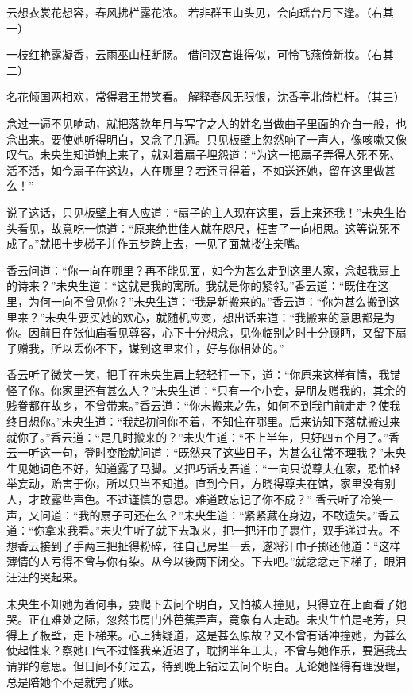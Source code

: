 \documentclass[a4paper,12pt,UTF8,twoside]{ctexbook}
\begin{document}
云想衣裳花想容，春风拂栏露花浓。
若非群玉山头见，会向瑶台月下逢。（右其一）

一枝红艳露凝香，云雨巫山枉断肠。
借问汉宫谁得似，可怜飞燕倚新妆。（右其二）

名花倾国两相欢，常得君王带笑看。
解释春风无限恨，沈香亭北倚栏杆。（其三）

念过一遍不见响动，就把落款年月与写字之人的姓名当做曲子里面的介白一般，也念出来。要使她听得明白，又念了几遍。只见板壁上忽然响了一声人，像咳嗽又像叹气。未央生知道她上来了，就对着扇子埋怨道：“为这一把扇子弄得人死不死、活不活，如今扇子在这边，人在哪里？若还寻得着，不如送还她，留在这里做甚么！”

说了这话，只见板壁上有人应道：“扇子的主人现在这里，丢上来还我！”未央生抬头看见，故意吃一惊道：“原来绝世佳人就在咫尺，枉害了一向相思。这等说死不成了。”就把十步梯子并作五步跨上去，一见了面就搂住亲嘴。

香云问道：“你一向在哪里？再不能见面，如今为甚么走到这里人家，念起我扇上的诗来？”未央生道：“这就是我的寓所。我就是你的紧邻。”香云道：“既住在这里，为何一向不曾见你？”未央生道：“我是新搬来的。”香云道：“你为甚么搬到这里来？”未央生要买她的欢心，就随机应变，想出话来道：“我搬来的意思都是为你。因前日在张仙庙看见尊容，心下十分想念，见你临别之时十分顾眄，又留下扇子赠我，所以丢你不下，谋到这里来住，好与你相处的。”

香云听了微笑一笑，把手在未央生肩上轻轻打一下，道：“你原来这样有情，我错怪了你。你家里还有甚么人？”未央生道：“只有一个小妾，是朋友赠我的，其余的贱眷都在故乡，不曾带来。”香云道：“你未搬来之先，如何不到我门前走走？使我终日想你。”未央生道：“我起初问你不着，不知住在哪里。后来访知下落就搬过来就你了。”香云道：“是几时搬来的？”未央生道：“不上半年，只好四五个月了。”香云一听这一句，登时变脸就问道：“既然来了这些日子，为甚么往常不理我？”未央生见她词色不好，知道露了马脚。又把巧话支吾道：“一向只说尊夫在家，恐怕轻举妄动，贻害于你，所以只当不知道。直到今日，方晓得尊夫在馆，家里没有别人，才敢露些声色。不过谨慎的意思。难道敢忘记了你不成？” 香云听了冷笑一声，又问道：“我的扇子可还在么？”未央生道：“紧紧藏在身边，不敢遗失。”香云道：“你拿来我看。”未央生听了就下去取来，把一把汗巾子裹住，双手递过去。不想香云接到了手两三把扯得粉碎，往自己房里一丢，遂将汗巾子掷还他道：“这样薄情的人亏得不曾与你有染。从今以後两下闭交。下去吧。”就忿忿走下梯子，眼泪汪汪的哭起来。

未央生不知她为着何事，要爬下去问个明白，又怕被人撞见，只得立在上面看了她哭。正在难处之际，忽然书房门外芭蕉弄声，竟象有人走动。未央生怕是艳芳，只得上了板壁，走下梯来。心上猜疑道，这是甚么原故？又不曾有话冲撞她，为甚么使起性来？察她口气不过怪我亲近迟了，耽搁半年工夫，不曾与她作乐，要逼我去请罪的意思。但日间不好过去，待到晚上钻过去问个明白。无论她怪得有理没理，总是陪她个不是就完了账。
\end{document}
